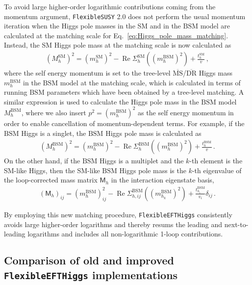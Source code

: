 \documentclass[final,3p,11pt,pdflatex]{elsarticle}
\makeatletter
\newcommand{\fs}{\texttt{FlexibleSUSY}\@\xspace}
\newcommand{\fstwo}{\fs 2.0\@\xspace}
\newcommand{\feft}{\texttt{Flex\-ib\-le\-EFT\-Higgs}\@\xspace}
\newcommand{\ol}[1]{\overline{#1}}
\newcommand{\MSbar}{\ensuremath{\ol{\text{MS}}}\xspace}
\newcommand{\DRbar}{\ensuremath{\ol{\text{DR}}}\xspace}
\newcommand{\SM}{\ensuremath{\text{SM}}\xspace}
\newcommand{\BSM}{\ensuremath{\text{BSM}}\xspace}
\DeclareMathOperator{\re}{Re}
\makeatother
\begin{document}
To avoid large higher-order logarithmic contributions coming from the
momentum argument, \fstwo does not  perform the usual momentum
iteration when the Higgs pole masses in the SM and in the
\BSM model are calculated at the matching scale for
Eq.~\eqref{eq:Higgs_pole_mass_matching}.  Instead, the SM Higgs pole mass at
the matching scale is now calculated as
%
\begin{align}
  (M_h^\SM)^2 = (m_h^\SM)^2 - \re\Sigma_h^{\SM}((m_h^\BSM)^2) + \frac{t_h^\SM}{v} \,,
  \label{eq:Higgs_pole_mass_matching_new}
\end{align}
%
where the self energy momentum is set to the tree-level
\MSbar/\DRbar Higgs mass $m_h^\BSM$ in the \BSM model at the matching
scale, which is calculated in terms of running \BSM parameters which
have been obtained by a tree-level matching.
%
A similar expression is used to calculate the Higgs pole mass in the
\BSM model $M_h^\BSM$, where we also insert $p^2 = (m_h^\BSM)^2$ as the
self energy momentum in order to enable cancellation of
momentum-dependent terms.  For example, if the \BSM Higgs is a
singlet, the \BSM Higgs pole mass is calculated as
%
\begin{align}
  (M_h^\BSM)^2 = (m_h^\BSM)^2 - \re\Sigma_h^{\BSM}((m_h^\BSM)^2) + \frac{t_h^\BSM}{v} \,.
  \label{eq:Higgs_pole_mass_matching_new_BSM_singlet}
\end{align}
%
On the other hand, if the \BSM Higgs is a multiplet and the $k$-th
element is the SM-like Higgs, then the SM-like \BSM Higgs pole mass is
the $k$-th eigenvalue of the loop-corrected mass matrix $\mathsf{M}_h$
in the interaction eigenstate basis,
%
\begin{align}
  (\mathsf{M}_h)_{ij} =
  (m_h^\BSM)^2_{ij} - \re\Sigma_{h,ij}^{\BSM}((m_{h_k}^\BSM)^2) + \frac{t_{h_i}^\BSM}{v_i}\delta_{ij}  \,.
  \label{eq:Higgs_pole_mass_matching_new_BSM_multiplet}
\end{align}
%

By employing this new matching procedure, \feft consistently avoids
large higher-order logarithms and thereby
resums the leading and next-to-leading logarithms and includes all
non-logarithmic 1-loop contributions.

\subsection{Comparison of old and improved \feft implementations}
\end{document}
